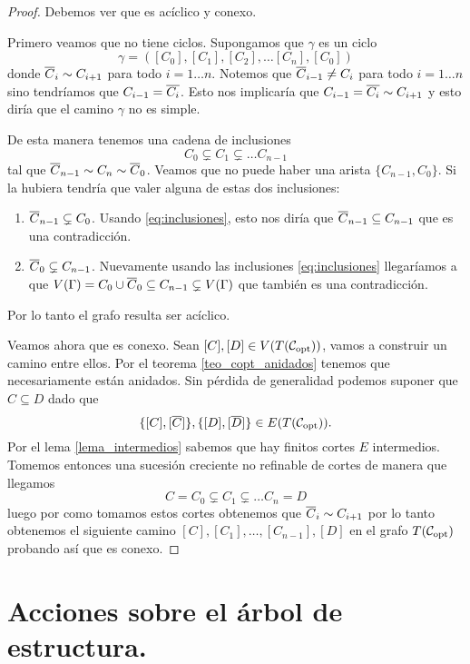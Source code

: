\documentclass[tesis.tex]{subfiles}
\begin{document}
\begin{proof}
	Debemos ver que es acíclico y conexo.
	
	Primero veamos que no tiene ciclos.
	Supongamos que $\gamma$	es un ciclo
	\[
		\gamma = ([C_0], [C_1], [C_2], \dots [C_{n}], [C_0])
	\]
	donde $\overline C_{i} \sim C_{i+1}$ para todo $i=1 \dots n$.
	Notemos que $\overline C_{i-1} \neq C_{i}$ para todo $i=1 \dots n$ sino tendríamos que $C_{i-1} = \overline{ C_{i}}$. 
	Esto nos implicaría que $C_{i-1} = \overline{C_{i}} \sim C_{i+1}$
	y esto diría que el camino $\gamma$ no es simple.
	
	De esta manera tenemos una cadena de inclusiones
	\begin{equation}\label{eq:inclusiones}
			C_0 \subsetneq C_1 \subsetneq \dots C_{n-1}
	\end{equation}
	tal que $\overline C_{n-1} \sim C_n \sim \overline C_0$.
	Veamos que no puede haber una arista $\{C_{n-1}, C_0\}$.
	Si la hubiera tendría que valer alguna de estas dos inclusiones:
	\begin{enumerate}
		\item $\overline C_{n-1} \subsetneq C_0$.
		Usando \ref{eq:inclusiones}, esto nos diría que $\overline C_{n-1} \subseteq C_{n-1}$ que es una contradicción.
		\item $\overline C_{0} \subsetneq C_{n-1}$.
		Nuevamente usando las inclusiones \ref{eq:inclusiones} llegaríamos a que $V(\Gamma) = C_0 \cup \overline C_0 \subseteq C_{n-1} \subsetneq V(\Gamma)$ que también es una contradicción.
	\end{enumerate}
	Por lo tanto el grafo resulta ser acíclico.
	
	Veamos ahora que es conexo.
	Sean $[C], [D] \in V(T({\cal C}_{\text{opt}}))$, vamos a construir un camino entre ellos.
	Por el teorema \ref{teo_copt_anidados} tenemos que necesariamente están anidados.
	Sin pérdida de generalidad podemos suponer que $C \subseteq D$ dado que
	\[
	\{[C], [\overline C]\}, \{[D],[\overline D]\} \in E(T({\cal C}_{\text{opt}})).
	\]
	Por el lema \ref{lema_intermedios} sabemos que hay finitos cortes $E$ intermedios.
	Tomemos entonces una sucesión creciente no refinable de cortes de manera que llegamos 
	\[
		C=C_0 \subsetneq C_1 \subsetneq \dots C_n = D
	\]
	luego por como tomamos estos cortes obtenemos que $\overline C_i \sim C_{i+1}$ por lo tanto obtenemos el siguiente camino $[C],[C_1], \dots, [C_{n-1}],[D]$ en el grafo $T({\cal C}_{\text{opt}})$ probando así que es conexo.	
\end{proof}





\section{Acciones sobre el árbol de estructura.}
\end{document}
